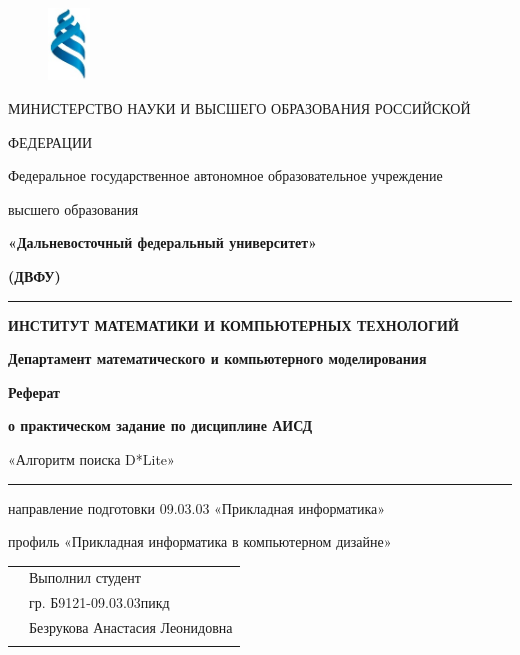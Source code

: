 \documentclass[12pt]{article}
\begin{document}
\begin{titlepage}


\[\] 


\noindent 

\noindent 

\begin{figure}
    \begin{center}
        \includegraphics[width=0.1\textwidth]{image1.png}
    \end{center}
\end{figure}
\thispagestyle{empty}

\begin{small}



\renewcommand{\baselinestretch}{2.0} %
\centerline{\large{МИНИСТЕРСТВО НАУКИ И ВЫСШЕГО ОБРАЗОВАНИЯ РОССИЙСКОЙ}}
\centerline{\large{ФЕДЕРАЦИИ}}
\centerline{Федеральное государственное автономное образовательное учреждение}
\centerline{высшего образования}
\centerline{\textbf{«Дальневосточный федеральный университет»}}
\centerline{\textbf{(ДВФУ)}}

\noindent\rule{\textwidth}{4pt}


\centerline{\textbf{ИНСТИТУТ МАТЕМАТИКИ И КОМПЬЮТЕРНЫХ ТЕХНОЛОГИЙ}}
\centerline{\textbf{Департамент математического и компьютерного моделирования}}

\vfill

\vfill

\centerline{\textbf{Реферат}}
\centerline{\textbf{о практическом задание по дисциплине АИСД}}
\centerline{«Алгоритм поиска D*Lite»}
\par\noindent\rule{\textwidth}{0.3pt}
\centerline{направление подготовки 09.03.03 «Прикладная информатика»}
\centerline{профиль «Прикладная информатика в компьютерном дизайне»}

\vfill

\vfill

\noindent
\begin{tabular}{p{} p{}}
 & Выполнил студент  \\
 &  гр. Б9121-09.03.03пикд \\
 & Безрукова Анастасия Леонидовна  \\
 & \parindent0pt \\
\end{tabular}


\end{small}
\end{titlepage}
\end{document}
